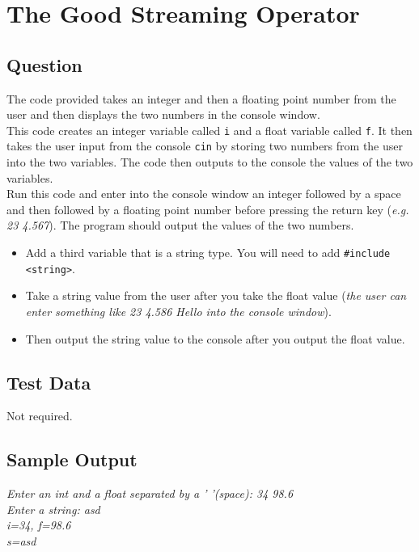 \documentclass[Lab-B.tex]{subfiles}
\begin{document}
    \section{The Good Streaming Operator}
        \subsection{Question}
        The code provided takes an integer and then a floating point number from the user and then displays the two numbers in the console window. \\
        
        This code creates an integer variable called \texttt{i} and a float variable called \texttt{f}. 
        It then takes the user input from the console \texttt{cin} by storing two numbers from the user into the two variables. 
        The code then outputs to the console the values of the two variables. \\
        
        Run this code and enter into the console window an integer followed by a space and then followed by a floating point number before pressing the return key (\textit{e.g. 23  4.567}). 
        The program should output the values of the two numbers.\\

        \begin{itemize}
            \item Add a third variable that is a string type. You will need to add \texttt{#include <string>}.

            \item Take a string value from the user after you take the float value (\textit{the user can enter something like 23  4.586  Hello into the console window}).

            \item Then output the string value to the console after you output the float value.
        \end{itemize}
            
        \subsection{Test Data}
            Not required.
        
        \subsection{Sample Output}
            \noindent\textit{
                Enter an int and a float separated by a ' '(space): 34 98.6\\
                Enter a string: asd\\
                i=34, f=98.6\\
                s=asd\\
            }
\end{document}
